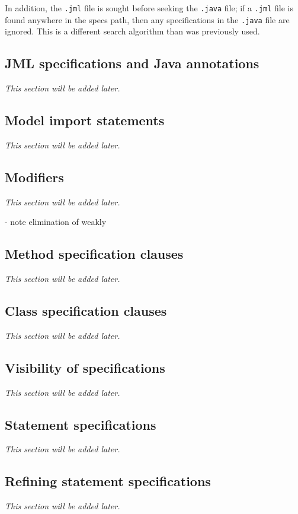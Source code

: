 \documentclass{report}%
\begin{document}
In addition, the {\tt .jml} file is sought before seeking the {\tt .java} file; if a {\tt .jml}
file is found anywhere in the specs path, then any specifications in the {\tt .java} file are 
ignored. This is a different search algorithm than was previously used.

\subsection{JML specifications and Java annotations}
\textit{This section will be added later.} %

\subsection{Model import statements}
\textit{This section will be added later.} %

\subsection{Modifiers}
\textit{This section will be added later.} %

- note elimination of weakly

\subsection{Method specification clauses}
\textit{This section will be added later.} %

\subsection{Class specification clauses}
\textit{This section will be added later.} %

\subsection{Visibility of specifications}
\textit{This section will be added later.} %

\subsection{Statement specifications}
\textit{This section will be added later.} %

\subsection{Refining statement specifications}
\textit{This section will be added later.} %
\end{document}
